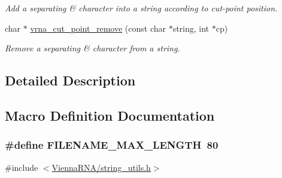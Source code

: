 \begin{DoxyCompactItemize}
\begin{DoxyCompactList}\small\item\em Add a separating \textquotesingle{}\&\textquotesingle{} character into a string according to cut-\/point position. \end{DoxyCompactList}\item 
char $\ast$ \hyperlink{group__string__utils_ga1fbd821d4408cc5f1dd9d12c15e092cb}{vrna\+\_\+cut\+\_\+point\+\_\+remove} (const char $\ast$string, int $\ast$cp)
\begin{DoxyCompactList}\small\item\em Remove a separating \textquotesingle{}\&\textquotesingle{} character from a string. \end{DoxyCompactList}\end{DoxyCompactItemize}


\subsection{Detailed Description}


\subsection{Macro Definition Documentation}
\subsubsection[{\texorpdfstring{F\+I\+L\+E\+N\+A\+M\+E\+\_\+\+M\+A\+X\+\_\+\+L\+E\+N\+G\+TH}{FILENAME_MAX_LENGTH}}]{\setlength{\rightskip}{0pt plus 5cm}\#define F\+I\+L\+E\+N\+A\+M\+E\+\_\+\+M\+A\+X\+\_\+\+L\+E\+N\+G\+TH~80}\hypertarget{group__string__utils_gafb228174279df9486a5cb56ac0bc79a3}{}\label{group__string__utils_gafb228174279df9486a5cb56ac0bc79a3}


{\ttfamily \#include $<$\hyperlink{string__utils_8h}{Vienna\+R\+N\+A/string\+\_\+utils.\+h}$>$}



